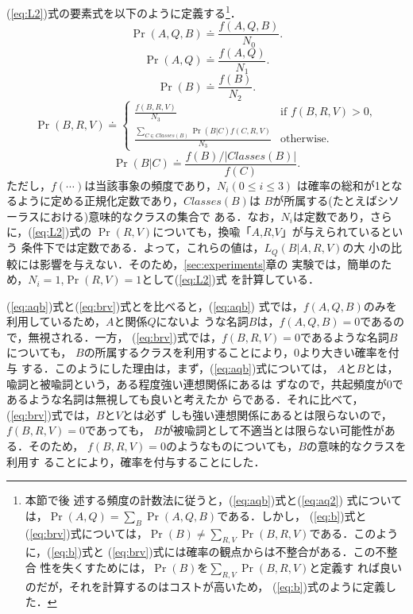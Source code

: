 (\ref{eq:L2})式の要素式を以下のように定義する\footnote{本節で後
  述する頻度の計数法に従うと，(\ref{eq:aqb})式と(\ref{eq:aq2})
  式については，$\Pr(A,Q) = \sum_B \Pr(A,Q,B)$である．しかし，
  (\ref{eq:b})式と(\ref{eq:brv})式については，$\Pr(B) \neq
  \sum_{R,V}\Pr(B,R,V)$である．このように，(\ref{eq:b})式と
  (\ref{eq:brv})式には確率の観点からは不整合がある．この不整合
  性を失くすためには，$\Pr(B)$を$\sum_{R,V} \Pr(B,R,V)$と定義す
  れば良いのだが，それを計算するのはコストが高いため，
  (\ref{eq:b})式のように定義した．}．
\begin{equation}
  \label{eq:aqb}
  \Pr(A,Q,B) \doteq \frac{f(A,Q,B)}{N_0}.
\end{equation}
\begin{equation}
  \label{eq:aq2}
  \Pr(A,Q) \doteq \frac{f(A,Q)}{N_1}.
\end{equation}
\begin{equation}
  \label{eq:b}
  \Pr(B) \doteq \frac{f(B)}{N_2}.
\end{equation}
\begin{equation}
  \label{eq:brv}
  \Pr(B,R,V) \doteq \left\{
    \begin{array}{ll}
      \frac{f(B,R,V)}{N_3} & \mbox{if } f(B,R,V) > 0,\\
      \frac{\sum_{C \in Classes(B)} \Pr(B|C) f(C,R,V)}{N_3} & \mbox{otherwise}.
    \end{array}
    \right.
\end{equation}
\begin{equation}
  \label{eq:bc}
  \Pr(B|C) \doteq \frac{f(B)/|Classes(B)|}{f(C)}.
\end{equation}
ただし，$f(\cdots)$は当該事象の頻度であり，$N_i(0\le i \le 3)$
は確率の総和が1となるように定める正規化定数であり，$Classes(B)$は
$B$が所属する(たとえばシソーラスにおける)意味的なクラスの集合で
ある．なお，$N_i$は定数であり，さらに，(\ref{eq:L2})式の
$\Pr(R,V)$についても，換喩「$A$,$R$,$V$」が与えられているという
条件下では定数である．よって，これらの値は，$L_Q(B|A,R,V)$の大
小の比較には影響を与えない．そのため，\ref{sec:experiments}章の
実験では，簡単のため，$N_i=1$,$\Pr(R,V)=1$として(\ref{eq:L2})式
を計算している．

(\ref{eq:aqb})式と(\ref{eq:brv})式とを比べると，(\ref{eq:aqb})
式では，$f(A,Q,B)$のみを利用しているため，$A$と関係$Q$にないよ
うな名詞$B$は，$f(A,Q,B)=0$であるので，無視される．一方，
(\ref{eq:brv})式では，$f(B,R,V)=0$であるような名詞$B$についても，
$B$の所属するクラスを利用することにより，0より大きい確率を付与
する．このようにした理由は，まず，(\ref{eq:aqb})式については，
$A$と$B$とは，喩詞と被喩詞という，ある程度強い連想関係にあるは
ずなので，共起頻度が0であるような名詞は無視しても良いと考えたか
らである．それに比べて，(\ref{eq:brv})式では，$B$と$V$とは必ず
しも強い連想関係にあるとは限らないので，$f(B,R,V)=0$であっても，
$B$が被喩詞として不適当とは限らない可能性がある．そのため，
$f(B,R,V)=0$のようなものについても，$B$の意味的なクラスを利用す
ることにより，確率を付与することにした．

